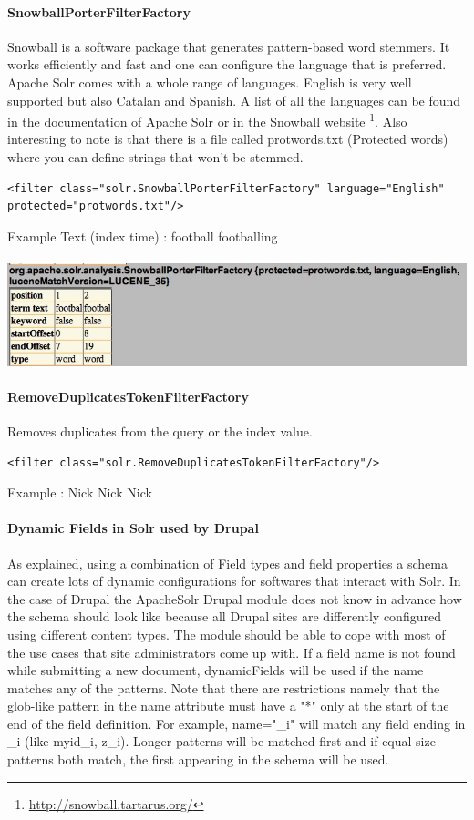 \paragraph{SnowballPorterFilterFactory} Snowball is a software package that generates pattern-based word stemmers. It works efficiently and fast and one can configure the language that is preferred. Apache Solr comes with a whole range of languages. English is very well supported but also Catalan and Spanish. A list of all the languages can be found in the documentation of Apache Solr or in the Snowball website \footnote{\url{http://snowball.tartarus.org/}}. Also interesting to note is that there is a file called protwords.txt (Protected words) where you can define strings that won't be stemmed.
\begin{verbatim}
<filter class="solr.SnowballPorterFilterFactory" language="English" protected="protwords.txt"/>
\end{verbatim}
Example Text (index time) : football footballing
\mbox{} \\
\mbox{} \\
\includegraphics[width=\textwidth]{images/snowballporterfilterfactory.jpg}

\paragraph{RemoveDuplicatesTokenFilterFactory} Removes duplicates from the query or the index value.
\begin{verbatim}
<filter class="solr.RemoveDuplicatesTokenFilterFactory"/>
\end{verbatim}
Example : Nick Nick Nick

\paragraph{Dynamic Fields in Solr used by Drupal}
As explained, using a combination of Field types and field properties a schema can create lots of dynamic configurations for softwares that interact with Solr. In the case of Drupal the ApacheSolr Drupal module does not know in advance how the schema should look like because all Drupal sites are differently configured using different content types. The module should be able to cope with most of the use cases that site administrators come up with. If a field name is not found while submitting a new document, dynamicFields will be used if the name matches any of the patterns. Note that there are restrictions namely that the glob-like pattern in the name attribute must have a "*" only at the start of the end of the field definition. For example, name="\*\_i" will match any field ending in \_i (like myid\_i, z\_i). Longer patterns will be matched first and if equal size patterns both match, the first appearing in the schema will be used.
 
